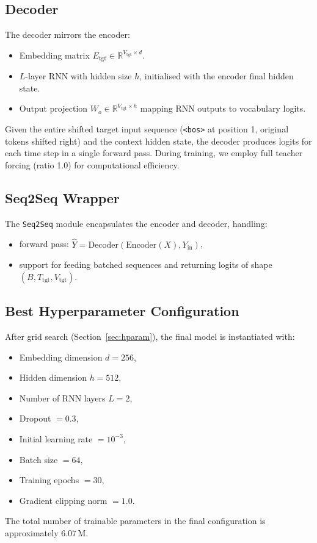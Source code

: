 \documentclass[runningheads]{llncs}
\begin{document}
\subsection{Decoder}
The decoder mirrors the encoder:
\begin{itemize}
    \item Embedding matrix \(E_{\text{tgt}} \in \mathbb{R}^{V_{\text{tgt}}\times d}\).
    \item \(L\)-layer RNN with hidden size \(h\), initialised with the encoder final hidden state.
    \item Output projection \(W_o \in \mathbb{R}^{V_{\text{tgt}}\times h}\) mapping RNN outputs to vocabulary logits.
\end{itemize}
Given the entire shifted target input sequence (\texttt{\textless bos\textgreater} at position 1, original tokens shifted right) and the context hidden state, the decoder produces logits for each time step in a single forward pass.
During training, we employ full teacher forcing (ratio 1.0) for computational efficiency.

\subsection{Seq2Seq Wrapper}
The \texttt{Seq2Seq} module encapsulates the encoder and decoder, handling:
\begin{itemize}
    \item forward pass: \(\hat{Y} = \text{Decoder}(\text{Encoder}(X), Y_{\text{in}})\),
    \item support for feeding batched sequences and returning logits of shape \((B, T_{\text{tgt}}, V_{\text{tgt}})\).
\end{itemize}

\subsection{Best Hyperparameter Configuration}
After grid search (Section~\ref{sec:hparam}), the final model is instantiated with:
\begin{itemize}
    \item Embedding dimension \(d = 256\),
    \item Hidden dimension \(h = 512\),
    \item Number of RNN layers \(L = 2\),
    \item Dropout \(= 0.3\),
    \item Initial learning rate \(=10^{-3}\),
    \item Batch size \(=64\),
    \item Training epochs \(=30\),
    \item Gradient clipping norm \(=1.0\).
\end{itemize}
The total number of trainable parameters in the final configuration is approximately 6.07\,M.
\end{document}
